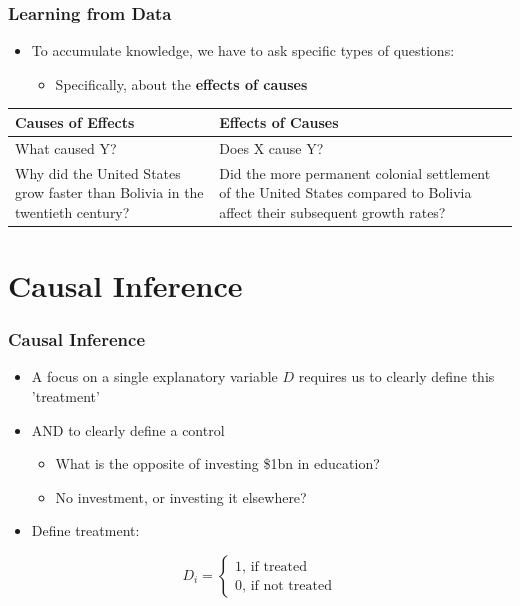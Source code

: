 \documentclass[xcolor=x11names,compress]{beamer}\usepackage[]{graphicx}\usepackage[]{color}
\renewcommand{\(}{\begin{columns}}
\renewcommand{\)}{\end{columns}}
\newcommand{\<}[1]{\begin{column}{#1}}
\renewcommand{\>}{\end{column}}
\begin{document}
\begin{frame}
\frametitle{Learning from Data}
\begin{itemize}
\item To accumulate knowledge, we have to ask specific types of questions:
\pause
\begin{itemize}
\item Specifically, about the \textbf{effects of causes}
\pause
\end{itemize}
\end{itemize}
\begin{table}[htbp]
  \centering
    \begin{tabular}{|>{\raggedright}p{5cm}|p{5cm}|}
    \toprule
    \textbf{Causes of Effects} & \textbf{Effects of Causes} \\
    \midrule
    What caused Y? & Does X cause Y? \\
    \midrule
    Why did the United States grow faster than Bolivia in the twentieth century? & Did the more permanent colonial settlement of the United States compared to Bolivia affect their subsequent growth rates? \\
    \bottomrule
    \end{tabular}%
  \label{tab:addlabel}%
\end{table}%
\end{frame}

\section{Causal Inference}

\begin{frame}
\frametitle{Causal Inference}
\begin{itemize}
\item A focus on a single explanatory variable $D$ requires us to clearly define this 'treatment' 
\pause
\item AND to clearly define a control
\pause
\begin{itemize}
\item What is the opposite of investing \$1bn in education?
\pause
\item No investment, or investing it elsewhere?
\pause
\end{itemize}
\item Define treatment:
\end{itemize}
\[D_i = 
\begin{cases}
1 \text{, if treated} \\
0 \text{, if not treated}
\end{cases}
\]
\end{frame}
\end{document}
